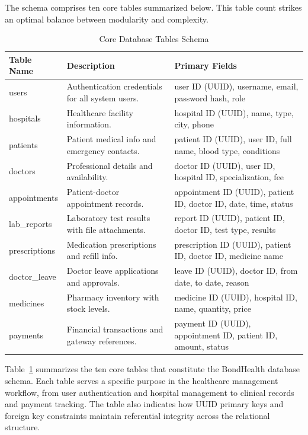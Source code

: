 \noindent The schema comprises ten core tables summarized below. This table count strikes an optimal balance between modularity and complexity.

\begin{table}[H]
\small
\centering
\caption{Core Database Tables Schema}
\label{tab:database-schema}
\renewcommand{\arraystretch}{1.3}
\begin{tabular}{|>{\raggedright\arraybackslash}p{2.6cm}|>{\raggedright\arraybackslash}p{6.3cm}|>{\raggedright\arraybackslash}p{4.7cm}|}
\hline
\textbf{Table Name} & \textbf{Description} & \textbf{Primary Fields} \\
\hline
users & Authentication credentials for all system users. & user ID (UUID), username, email, password hash, role \\
\hline
hospitals & Healthcare facility information. & hospital ID (UUID), name, type, city, phone \\
\hline
patients & Patient medical info and emergency contacts. & patient ID (UUID), user ID, full name, blood type, conditions \\
\hline
doctors & Professional details and availability. & doctor ID (UUID), user ID, hospital ID, specialization, fee \\
\hline
appointments & Patient-doctor appointment records. & appointment ID (UUID), patient ID, doctor ID, date, time, status \\
\hline
lab\_reports & Laboratory test results with file attachments. & report ID (UUID), patient ID, doctor ID, test type, results \\
\hline
prescriptions & Medication prescriptions and refill info. & prescription ID (UUID), patient ID, doctor ID, medicine name \\
\hline
doctor\_leave & Doctor leave applications and approvals. & leave ID (UUID), doctor ID, from date, to date, reason \\
\hline
medicines & Pharmacy inventory with stock levels. & medicine ID (UUID), hospital ID, name, quantity, price \\
\hline
payments & Financial transactions and gateway references. & payment ID (UUID), appointment ID, patient ID, amount, status \\
\hline
\end{tabular}
\end{table}
\noindent Table~\ref{tab:database-schema} summarizes the ten core tables that constitute the BondHealth database schema. Each table serves a specific purpose in the healthcare management workflow, from user authentication and hospital management to clinical records and payment tracking. The table also indicates how UUID primary keys and foreign key constraints maintain referential integrity across the relational structure.
\FloatBarrier

